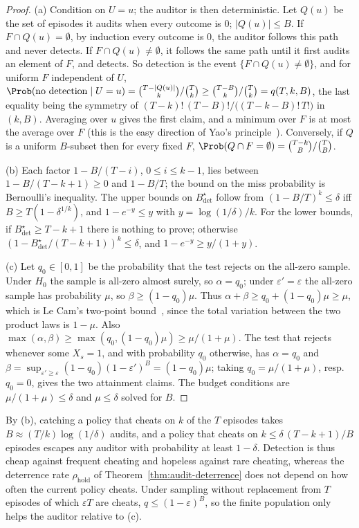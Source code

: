 \begin{proof}
(a) Condition on $U=u$; the auditor is then deterministic. Let $Q(u)$ be the
set of episodes it audits when every outcome is $0$; $|Q(u)|\le B$. If
$F\cap Q(u)=\emptyset$, by induction every outcome is $0$, the auditor follows
this path and never detects. If $F\cap Q(u)\ne\emptyset$, it follows the same
path until it first audits an element of $F$, and detects. So detection is the
event $\{F\cap Q(u)\neq\emptyset\}$, and for uniform $F$ independent of $U$,
$\Prob(\text{no detection}\mid U=u)=\binom{T-|Q(u)|}{k}/\binom Tk\ge
\binom{T-B}{k}/\binom Tk=q(T,k,B)$, the last equality being the symmetry of
$(T-k)!\,(T-B)!/\bigl((T-k-B)!\,T!\bigr)$ in $(k,B)$. Averaging over $u$ gives the first
claim, and a minimum over $F$ is at most the average over $F$ (this is the easy
direction of Yao's principle~\cite{yao1977probabilistic}). Conversely, if $Q$ is
a uniform $B$-subset then for every fixed $F$,
$\Prob(Q\cap F=\emptyset)=\binom{T-k}{B}/\binom TB$.

(b) Each factor $1-B/(T-i)$, $0\le i\le k-1$, lies between $1-B/(T-k+1)\ge0$
and $1-B/T$; the bound on the miss probability is Bernoulli's inequality. The
upper bounds on $B^\star_{\mathrm{det}}$ follow from $(1-B/T)^k\le\delta$ iff
$B\ge T(1-\delta^{1/k})$, and $1-e^{-y}\le y$ with $y=\log(1/\delta)/k$. For the
lower bounds, if $B^\star_{\mathrm{det}}\ge T-k+1$ there is nothing to prove;
otherwise $(1-B^\star_{\mathrm{det}}/(T-k+1))^k\le\delta$, and
$1-e^{-y}\ge y/(1+y)$.

(c) Let $q_0\in[0,1]$ be the probability that the test rejects on the all-zero
sample. Under $H_0$ the sample is all-zero almost surely, so $\alpha=q_0$; under
$\varepsilon'=\varepsilon$ the all-zero sample has probability $\mu$, so
$\beta\ge(1-q_0)\mu$. Thus $\alpha+\beta\ge q_0+(1-q_0)\mu\ge\mu$, which is Le
Cam's two-point bound~\cite{lecam1973convergence,yu1997assouad}, since the total
variation between the two product laws is $1-\mu$. Also
$\max(\alpha,\beta)\ge\max(q_0,(1-q_0)\mu)\ge\mu/(1+\mu)$. The test that rejects
whenever some $X_s=1$, and with probability $q_0$ otherwise, has $\alpha=q_0$
and $\beta=\sup_{\varepsilon'\ge\varepsilon}(1-q_0)(1-\varepsilon')^B=(1-q_0)\mu$;
taking $q_0=\mu/(1+\mu)$, resp.\ $q_0=0$, gives the two attainment claims. The
budget conditions are $\mu/(1+\mu)\le\delta$ and $\mu\le\delta$ solved for $B$.
\end{proof}

\begin{remark}\label{rem:audit-detect-deter}
By (b), catching a policy that cheats on $k$ of the $T$ episodes takes
$B\approx(T/k)\log(1/\delta)$ audits, and a policy that cheats on
$k\le\delta\,(T-k+1)/B$ episodes escapes any auditor with probability at least
$1-\delta$. Detection is thus cheap against frequent cheating and hopeless
against rare cheating, whereas the deterrence rate $\rho_{\mathrm{hold}}$ of
Theorem~\ref{thm:audit-deterrence} does not depend on how often the current
policy cheats. Under sampling without replacement from $T$ episodes of which
$\varepsilon T$ are cheats, $q\le(1-\varepsilon)^B$, so the finite population
only helps the auditor relative to (c).
\end{remark}

